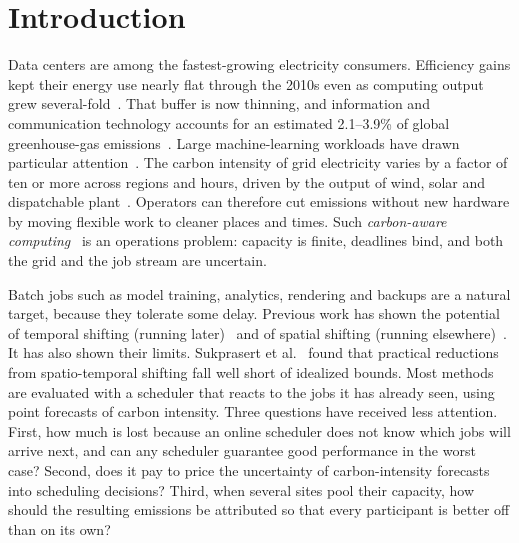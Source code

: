 \section{Introduction}\label{sec:intro}

Data centers are among the fastest-growing electricity consumers. Efficiency gains kept their energy use nearly flat through the 2010s even as computing output grew several-fold~\cite{masanet2020recalibrating,shehabi2016united}. That buffer is now thinning, and information and communication technology accounts for an estimated 2.1--3.9\% of global greenhouse-gas emissions~\cite{freitag2021real}. Large machine-learning workloads have drawn particular attention~\cite{strubell2019energy,patterson2022carbon,dodge2022measuring}. The carbon intensity of grid electricity varies by a factor of ten or more across regions and hours, driven by the output of wind, solar and dispatchable plant~\cite{staffell2017measuring}. Operators can therefore cut emissions without new hardware by moving flexible work to cleaner places and times. Such \emph{carbon-aware computing}~\cite{radovanovic2023carbon,bashir2021enabling} is an operations problem: capacity is finite, deadlines bind, and both the grid and the job stream are uncertain.

Batch jobs such as model training, analytics, rendering and backups are a natural target, because they tolerate some delay. Previous work has shown the potential of temporal shifting (running later)~\cite{wiesner2021lets,goiri2012greenhadoop,hanafy2023carbonscaler} and of spatial shifting (running elsewhere)~\cite{liu2011greening,zheng2020mitigating}. It has also shown their limits. Sukprasert et al.~\cite{sukprasert2024limitations} found that practical reductions from spatio-temporal shifting fall well short of idealized bounds. Most methods are evaluated with a scheduler that reacts to the jobs it has already seen, using point forecasts of carbon intensity. Three questions have received less attention. First, how much is lost because an online scheduler does not know which jobs will arrive next, and can any scheduler guarantee good performance in the worst case? Second, does it pay to price the uncertainty of carbon-intensity forecasts into scheduling decisions? Third, when several sites pool their capacity, how should the resulting emissions be attributed so that every participant is better off than on its own?

